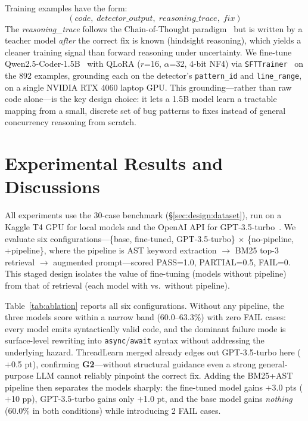 \documentclass[runningheads]{llncs}
\begin{document}
Training examples have the form:
\[
  (\textit{code},\; \textit{detector\_output},\; \textit{reasoning\_trace},\; \textit{fix})
\]
The \textit{reasoning\_trace} follows the Chain-of-Thought
paradigm~\cite{cot} but is written by a teacher model \emph{after} the
correct fix is known (hindsight reasoning), which yields a cleaner training
signal than forward reasoning under uncertainty.
We fine-tune Qwen2.5-Coder-1.5B~\cite{qwen25coder} with QLoRA ($r$=16,
$\alpha$=32, 4-bit NF4) via \texttt{SFTTrainer}~\cite{trl} on the 892
examples, grounding each on the detector's \texttt{pattern\_id} and
\texttt{line\_range}, on a single NVIDIA RTX 4060 laptop GPU.
This grounding---rather than raw code alone---is the key design choice: it
lets a 1.5B model learn a tractable mapping from a small, discrete set of
bug patterns to fixes instead of general concurrency reasoning from scratch.

\section{Experimental Results and Discussions}
\label{sec:eval}

\label{sec:eval:setup}
\label{sec:eval:nopipeline}
\label{sec:eval:pipeline}
\label{sec:eval:ablation}

All experiments use the 30-case benchmark (\S\ref{sec:design:dataset}),
run on a Kaggle T4 GPU for local models and the OpenAI API for
GPT-3.5-turbo~\cite{gpt35}.
We evaluate six configurations---\{base, fine-tuned, GPT-3.5-turbo\}
$\times$ \{no-pipeline, +pipeline\}, where the pipeline is
AST keyword extraction $\to$ BM25 top-3 retrieval $\to$ augmented
prompt---scored PASS=1.0, PARTIAL=0.5, FAIL=0.
This staged design isolates the value of fine-tuning (models without
pipeline) from that of retrieval (each model with vs.\ without pipeline).

Table~\ref{tab:ablation} reports all six configurations.
Without any pipeline, the three models score within a narrow band
(60.0--63.3\%) with zero FAIL cases: every model emits syntactically valid
code, and the dominant failure mode is surface-level rewriting into
\texttt{async}/\texttt{await} syntax without addressing the underlying
hazard.
ThreadLearn merged already edges out GPT-3.5-turbo here ($+$0.5 pt),
confirming \textbf{G2}---without structural guidance even a strong
general-purpose LLM cannot reliably pinpoint the correct fix.
Adding the BM25+AST pipeline then separates the models sharply: the
fine-tuned model gains $+$3.0 pts ($+$10 pp), GPT-3.5-turbo gains only
$+$1.0 pt, and the base model gains \emph{nothing} (60.0\% in both
conditions) while introducing 2 FAIL cases.
\end{document}
